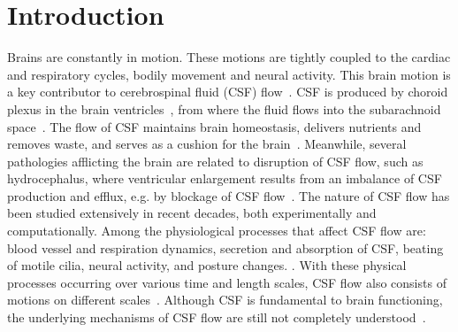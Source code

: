 \documentclass{template}
\begin{document}
\newpage
\section{Introduction}
Brains are constantly in motion. These motions are tightly coupled
to the cardiac and respiratory cycles, bodily movement and
neural activity. This brain motion is a key contributor to
cerebrospinal fluid (CSF) flow~\citep{Enzmann1992BrainImaging,
baledent2001cerebrospinal, sweetman2011cerebrospinal}.
CSF is produced by choroid plexus in the brain ventricles~\citep{Damkier2013},
from where the fluid flows into the subarachnoid
space~\citep{rasmussen2018glymphatic}.
The flow of CSF maintains brain homeostasis,
delivers nutrients and removes waste, and
serves as a cushion for the brain~\citep{fame2020emergence,
kelley2023cerebrospinal, linninger2016cerebrospinal}.
Meanwhile, several pathologies afflicting the brain
are related to disruption of CSF flow,
such as hydrocephalus, where ventricular enlargement
results from an imbalance of CSF production and efflux,
e.g. by blockage of CSF flow~\citep{linninger2016cerebrospinal}.
The nature of CSF flow has been studied extensively
in recent decades, both experimentally and computationally.
Among the physiological processes that affect CSF flow are:
blood vessel and respiration dynamics,
secretion and absorption of CSF,
beating of motile cilia, neural activity, and posture changes.
\citep{kelley2023cerebrospinal, sweetman2011cerebrospinal,
Olstad2019CiliaryDevelopment, Faubel2016CiliaVentricles,
Kurtcuoglu2007ComputationalSylvius, Czosnyka2004CerebrospinalDynamics,
Vinje2019RespiratoryMeasurements, Liu2024UsingBreathing,
baledent2001cerebrospinal}.
With these physical processes occurring
over various time and length scales, CSF flow
also consists of motions on different
scales~\citep{kelley2023cerebrospinal}.
Although CSF is fundamental to brain functioning,
the underlying mechanisms of CSF flow are still not
completely understood~\citep{kelley2023cerebrospinal}.
\end{document}
